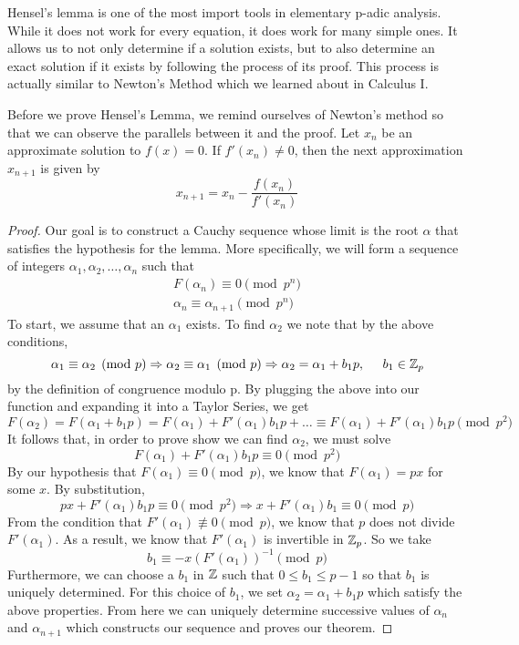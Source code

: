 \documentclass[a4paper]{article}
\begin{document}
Hensel's lemma is one of the most import tools in elementary p-adic 
analysis.  While it does not work for every equation, it does work for
many simple ones.  It allows us to not only determine if a solution
exists, but to also determine an exact solution if it exists by following 
the process of its proof.  This process is actually similar to Newton's
Method which we learned about in Calculus I.

Before we prove Hensel's Lemma, we remind ourselves of Newton's method so 
that we can observe the parallels between it and the proof.  Let $x_n$ be
an approximate solution to $f(x)=0$.  If $f'(x_n)\neq 0$, then the next
approximation $x_{n+1}$ is given by
\[
	x_{n+1}=x_n-\frac{f(x_n)}{f'(x_n)}
\]

\begin{proof}
Our goal is to construct a Cauchy sequence whose limit is the root 
$\alpha$ that satisfies the hypothesis for the lemma.  More specifically, 
we will form a sequence of integers $\alpha_1,\alpha_2,\dots,\alpha_n$ such 
that
\[
  \begin{gathered}
    F(\alpha_n)\equiv0\pmod{p^n}\\
    \alpha_{n}\equiv\alpha_{n+1}\pmod{p^n}
  \end{gathered}
\]
To start, we assume that an $\alpha_1$ exists.  To find $\alpha_2$ we 
note that by the above conditions,
\[
	\alpha_1\equiv\alpha_2\pmod{p}\Rightarrow
    \alpha_2\equiv\alpha_1\pmod{p}\Rightarrow
    \alpha_2=\alpha_1+b_1p,
    \;\;\;\;\;b_1\in\mathbb Z_p
\]
by the definition of congruence modulo p.  By plugging the above into our 
function and expanding it into a Taylor Series, we get
\[
	F(\alpha_2)=F(\alpha_1+b_1p)=F(\alpha_1)+F'(\alpha_1)b_1p+\dots
    \equiv F(\alpha_1)+F'(\alpha_1)b_1p\pmod{p^2}
\]
It follows that, in order to prove show we can find $\alpha_2$, we must 
solve
\[
  F(\alpha_1)+F'(\alpha_1)b_1p\equiv 0\pmod{p^2}
\]
By our hypothesis that $F(\alpha_1)\equiv0\pmod{p}$, we know that 
$F(\alpha_1)=px$ for some $x$.  By substitution,
\[
	px+F'(\alpha_1)b_1p\equiv0\pmod{p^2}\Rightarrow x+F'(\alpha_1)b_1
    \equiv0\pmod p
\]
From the condition that $F'(\alpha_1)\not\equiv0\pmod p$, we know that
$p$ does not divide $F'(\alpha_1)$.  As a result, we know that
$F'(\alpha_1)$ is invertible in $\mathbb Z_p$.  So we take
\[
	b_1\equiv-x(F'(\alpha_1))^{-1}\pmod{p}
\]
Furthermore, we can choose a $b_1$ in $\mathbb Z$ such that 
$0\leq b_1\leq p-1$ so that $b_1$ is uniquely determined.  For this 
choice of $b_1$, we set $\alpha_2=\alpha_1+b_1p$ which satisfy the above 
properties.  From here we can uniquely determine successive values of 
$\alpha_n$ and $\alpha_{n+1}$ which constructs our sequence and proves
our theorem.
\end{proof}
\end{document}
